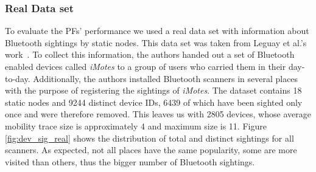 
\subsubsection{Real Data set}

To evaluate the PFs' performance we used a real data set with
information about Bluetooth sightings by static nodes. This data set
was taken from Leguay et al.'s work~\cite{leguay2006opportunistic}. To
collect this information, the authors handed out a set of Bluetooth
enabled devices called \emph{iMotes} to a group of users who carried
them in their day-to-day. Additionally, the authors installed
Bluetooth scanners in several places with the purpose of registering the
sightings of \emph{iMotes}. The dataset contains 18 static nodes and
9244 distinct device IDs, 6439 of which have been sighted only once
and were therefore removed. This leaves us with 2805 devices, whose
average mobility trace size is approximately 4 and maximum size is
11. Figure \ref{fig:dev_sig_real} shows the distribution of total and
distinct sightings for all scanners. As expected, not all places have
the same popularity, some are more visited than others, thus the
bigger number of Bluetooth sightings.

